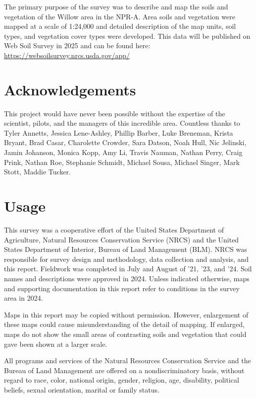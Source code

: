 \documentclass[
]{book}
\theoremstyle{definition}
\theoremstyle{definition}
\theoremstyle{definition}
\theoremstyle{definition}
\theoremstyle{remark}
\begin{document}
The primary purpose of the survey was to describe and map the soils and vegetation of the Willow area in the NPR-A. Area soils and vegetation were mapped at a scale of 1:24,000 and detailed description of the map units, soil types, and vegetation cover types were developed. This data will be published on Web Soil Survey in 2025 and can be found here: \url{https://websoilsurvey.nrcs.usda.gov/app/}

\hypertarget{acknowledgements}{%
\section{Acknowledgements}\label{acknowledgements}}

This project would have never been possible without the expertise of the scientist, pilots, and the managers of this incredible area. Countless thanks to Tyler Annetts, Jessica Lene-Ashley, Phillip Barber, Luke Breneman, Krista Bryant, Brad Casar, Charolette Crowder, Sara Datson, Noah Hull, Nic Jelinski, Jamin Johanson, Monica Kopp, Amy Li, Travis Nauman, Nathan Perry, Craig Prink, Nathan Roe, Stephanie Schmidt, Michael Sousa, Michael Singer, Mark Stott, Maddie Tucker.

\hypertarget{usage}{%
\section{Usage}\label{usage}}

This survey was a cooperative effort of the United States Department of Agriculture, Natural Resources Conservation Service (NRCS) and the United States Department of Interior, Bureau of Land Management (BLM). NRCS was responsible for survey design and methodology, data collection and analysis, and this report. Fieldwork was completed in July and August of '21, '23, and '24. Soil names and descriptions were approved in 2024. Unless indicated otherwise, maps and supporting documentation in this report refer to conditions in the survey area in 2024.

Maps in this report may be copied without permission. However, enlargement of these maps could cause misunderstanding of the detail of mapping. If enlarged, maps do not show the small areas of contrasting soils and vegetation that could gave been shown at a larger scale.

All programs and services of the Natural Resources Conservation Service and the Bureau of Land Management are offered on a nondiscriminatory basis, without regard to race, color, national origin, gender, religion, age, disability, political beliefs, sexual orientation, marital or family status.
\end{document}
